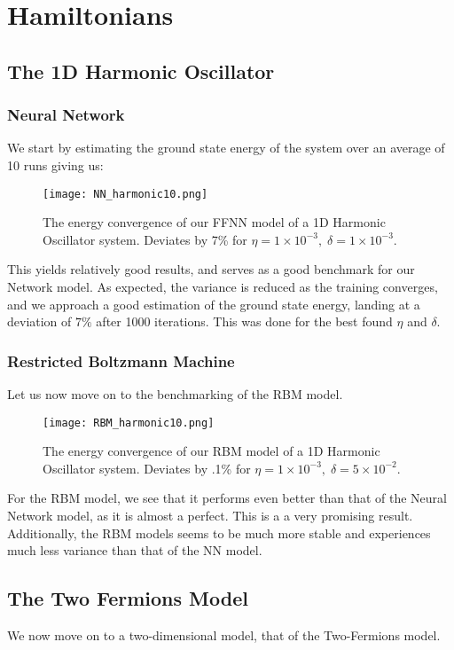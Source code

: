 \documentclass[12pt]{article}
\begin{document}
{\section{Hamiltonians}
\subsection{The 1D Harmonic Oscillator}
\subsubsection*{Neural Network}
We start by estimating the ground state energy of the system over an average of 10 runs giving us:
\begin{figure}[ht!]
    \centering
    \texttt{[image: NN\_harmonic10.png]}
    \caption{The energy convergence of our FFNN model of a 1D Harmonic Oscillator system. Deviates by 7\% for $\eta = 1 \times 10^{-3}, \; \delta = 1 \times 10^{-3}$.}
    \label{fig:NNho}
\end{figure}\newline
This yields relatively good results, and serves as a good benchmark for our Network model. As expected, the variance is reduced as the training converges, and we approach a good estimation of the ground state energy, landing at a deviation of $7\%$ after 1000 iterations. This was done for the best found $\eta$ and $\delta$.
\newpage
\subsubsection*{Restricted Boltzmann Machine}
Let us now move on to the benchmarking of the RBM model.
\begin{figure}[ht!]
    \centering
    \texttt{[image: RBM\_harmonic10.png]}
    \caption{The energy convergence of our RBM model of a 1D Harmonic Oscillator system. Deviates by .1\% for $\eta = 1 \times 10^{-3}, \; \delta = 5 \times 10^{-2}$.}
    \label{fig:RBMho}
\end{figure}
\newline
For the RBM model, we see that it performs even better than that of the Neural Network model, as it is almost a perfect. This is a a very promising result. Additionally, the RBM models seems to be much more stable and experiences much less variance than that of the NN model.
\newpage
\subsection{The Two Fermions Model}
We now move on to a two-dimensional model, that of the Two-Fermions model.
}
\end{document}
